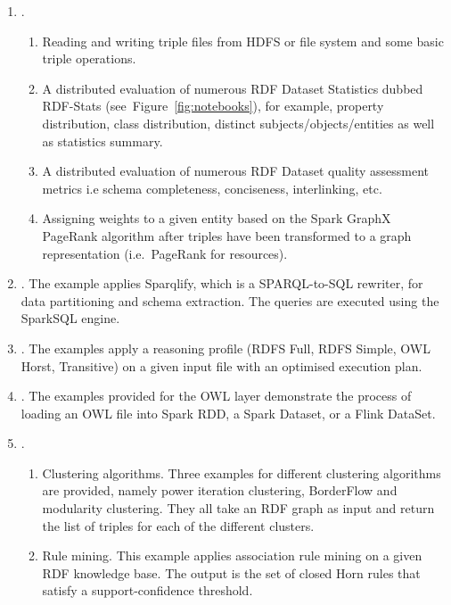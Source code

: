 \begin{enumerate}
    \item {}.
    \begin{enumerate}
      \item Reading and writing triple files from \gls{HDFS} or file system and some basic triple operations.
      \item A distributed evaluation of numerous \gls{RDF} Dataset Statistics dubbed RDF-Stats (see~Figure~\ref{fig:notebooks}), for example, property distribution, class distribution, distinct subjects/objects/entities as well as statistics summary.
      \item A distributed evaluation of numerous \gls{RDF} Dataset quality assessment metrics i.e schema completeness, conciseness, interlinking, etc.
      \item Assigning weights to a given entity based on the Spark GraphX PageRank algorithm after triples have been transformed to a graph representation (i.e.~PageRank for resources).
    \end{enumerate}
    \item {}. 
    The example applies Sparqlify, which is a SPARQL-to-SQL rewriter, for data partitioning and schema extraction. The queries are executed using the SparkSQL engine.
    \item {}. The examples apply a reasoning profile (\gls{RDFS} Full, \gls{RDFS} Simple, \gls{OWL} Horst, Transitive) on a given input file with an optimised execution plan.
    \item {}. 
    The examples provided for the \gls{OWL} layer demonstrate the process of loading an \gls{OWL} file into Spark \gls{RDD}, a Spark Dataset, or a Flink DataSet.
    \item {}.
    \begin{enumerate}
        \item Clustering algorithms. Three examples for different clustering algorithms are provided, namely power iteration clustering, BorderFlow and modularity clustering. 
        They all take an \gls{RDF} graph as input and return the list of triples for each of the different clusters.
        \item Rule mining. 
        This example applies association rule mining on a given \gls{RDF} knowledge base. The output is the set of closed Horn rules that satisfy a support-confidence threshold.
    \end{enumerate}
\end{enumerate}


